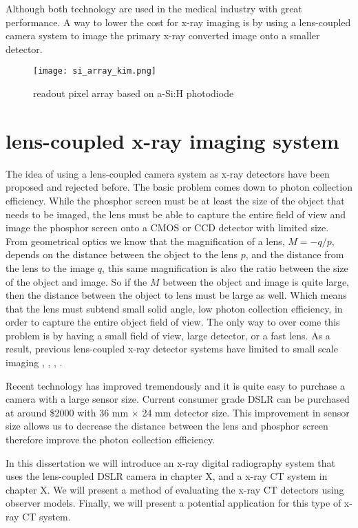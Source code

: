 Although both technology are used in the medical industry with great performance.  A way to lower the cost for x-ray imaging is by using a lens-coupled camera system to image the primary x-ray converted image onto a smaller detector.

\begin{figure}
\texttt{[image: si\_array\_kim.png]}
\label{fig:a-Si:H array}
\caption{readout pixel array based on a-Si:H photodiode}
\end{figure}

\section{lens-coupled x-ray imaging system}
The idea of using a lens-coupled camera system as x-ray detectors have been proposed and rejected before.  The basic problem comes down to photon collection efficiency.  While the phosphor screen must be at least the size of the object that needs to be imaged, the lens must be able to capture the entire field of view and image the phosphor screen onto a CMOS or CCD detector with limited size.  From geometrical optics we know that the magnification of a lens, $M = -q/p$, depends on the distance between the object to the lens $p$, and the distance from the lens to the image $q$, this same magnification is also the ratio between the size of the object and image.  So if the $M$ between the object and image is quite large, then the distance between the object to lens must be large as well.  Which means that the lens must subtend small solid angle, low photon collection efficiency, in order to capture the entire object field of view.  The only way to over come this problem is by having a small field of view, large detector, or a fast lens.  As a result, previous lens-coupled x-ray detector systems have limited to small scale imaging \cite{kim2005}, \cite{lee2001}, \cite{tate2005}, \cite{madden2006}.  

Recent technology has improved tremendously and it is quite easy to purchase a camera with a large sensor size.  Current consumer grade DSLR can be purchased at around \$2000 with 36 mm $\times$ 24 mm detector size.  This improvement in sensor size allows us to decrease the distance between the lens and phosphor screen therefore improve the photon collection efficiency.

In this dissertation we will introduce an x-ray digital radiography system that uses the lens-coupled DSLR camera in chapter X, and a x-ray CT system in chapter X.  We will present a method of evaluating the x-ray CT detectors using observer models.  Finally, we will present a potential application for this type of x-ray CT system.
